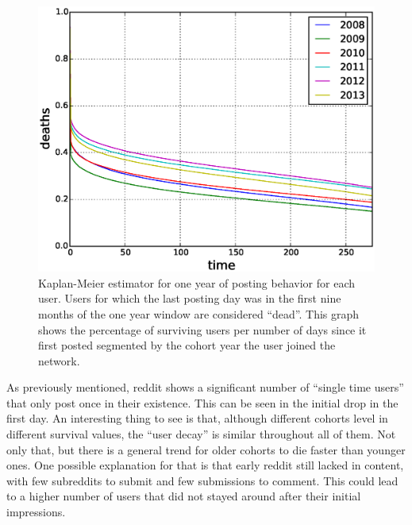\begin{figure}[!tb]
\centering
\includegraphics[scale=0.4]{./images/kaplan_meier_users.eps}
\caption{Kaplan-Meier estimator for one year of posting behavior for each user. Users for which the last posting day was in the first nine months of the one year window are considered ``dead''. This graph shows the percentage of surviving users per number of days since it first posted segmented by the cohort year the user joined the network.}
\label{fig:kaplan_meier_users}
\end{figure}

As previously mentioned, reddit shows a significant number of ``single time users'' that only post once in their existence. This can be seen in the initial drop in the first day. An interesting thing to see is that, although different cohorts level in different survival values, the ``user decay'' is similar throughout all of them. Not only that, but there is a general trend for older cohorts to die faster than younger ones. One possible explanation for that is that early reddit still lacked in content, with few subreddits to submit and few submissions to comment. This could lead to a higher number of users that did not stayed around after their initial impressions. 

